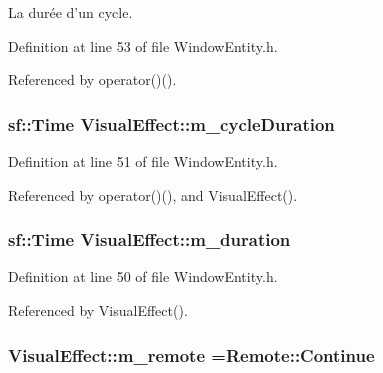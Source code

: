 La durée d'un cycle. 



Definition at line 53 of file Window\-Entity.\-h.



Referenced by operator()().

\hypertarget{class_visual_effect_a9b414b1c6acfebad5d33a6b767c45ff7}{
\subsubsection[{m\-\_\-cycle\-Duration}]{\setlength{\rightskip}{0pt plus 5cm}sf\-::\-Time Visual\-Effect\-::m\-\_\-cycle\-Duration\hspace{0.3cm}{\ttfamily [protected]}}}\label{class_visual_effect_a9b414b1c6acfebad5d33a6b767c45ff7}


Definition at line 51 of file Window\-Entity.\-h.



Referenced by operator()(), and Visual\-Effect().

\hypertarget{class_visual_effect_abb44ecb249d5fca2af1ecd72c5a20e49}{
\subsubsection[{m\-\_\-duration}]{\setlength{\rightskip}{0pt plus 5cm}sf\-::\-Time Visual\-Effect\-::m\-\_\-duration\hspace{0.3cm}{\ttfamily [protected]}}}\label{class_visual_effect_abb44ecb249d5fca2af1ecd72c5a20e49}


Definition at line 50 of file Window\-Entity.\-h.



Referenced by Visual\-Effect().

\hypertarget{class_visual_effect_a345e31dcd679c46231bb028f4eb716fd}{
\subsubsection[{m\-\_\-remote}]{ Visual\-Effect\-::m\-\_\-remote =Remote\-::\-Continue\hspace{0.3cm}{\ttfamily [protected]}}}\label{class_visual_effect_a345e31dcd679c46231bb028f4eb716fd}


